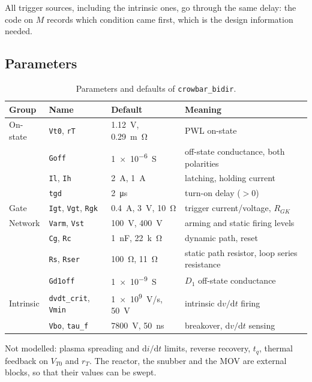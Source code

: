 \documentclass[11pt,a4paper]{article}
\begin{document}
All trigger sources, including the intrinsic ones, go through the same delay: the code on $M$
records which condition came first, which is the design information needed.

\subsection{Parameters}

\begin{table}[htbp]
\centering
\caption{Parameters and defaults of \texttt{crowbar\_bidir}.}
\label{tab:par}
\begin{tabular}{@{}llll@{}}
\toprule
Group & Name & Default & Meaning \\
\midrule
On-state & \texttt{Vt0}, \texttt{rT} & \SI{1.12}{V}, \SI{0.29}{m\ohm} & PWL on-state \\
 & \texttt{Goff} & \SI{1e-6}{S} & off-state conductance, both polarities \\
 & \texttt{Il}, \texttt{Ih} & \SI{2}{A}, \SI{1}{A} & latching, holding current \\
 & \texttt{tgd} & \SI{2}{\micro s} & turn-on delay ($>0$) \\
Gate & \texttt{Igt}, \texttt{Vgt}, \texttt{Rgk} & \SI{0.4}{A}, \SI{3}{V}, \SI{10}{\ohm} & trigger current/voltage, $R_{GK}$ \\
Network & \texttt{Varm}, \texttt{Vst} & \SI{100}{V}, \SI{400}{V} & arming and static firing levels \\
 & \texttt{Cg}, \texttt{Rc} & \SI{1}{nF}, \SI{22}{k\ohm} & dynamic path, reset \\
 & \texttt{Rs}, \texttt{Rser} & \SI{100}{\ohm}, \SI{11}{\ohm} & static path resistor, loop series resistance \\
 & \texttt{Gd1off} & \SI{1e-9}{S} & $D_1$ off-state conductance \\
Intrinsic & \texttt{dvdt\_crit}, \texttt{Vmin} & \SI{1e9}{V/s}, \SI{50}{V} & intrinsic $\mathrm{d}v/\mathrm{d}t$ firing \\
 & \texttt{Vbo}, \texttt{tau\_f} & \SI{7800}{V}, \SI{50}{ns} & breakover, $\mathrm{d}v/\mathrm{d}t$ sensing \\
\bottomrule
\end{tabular}
\end{table}

Not modelled: plasma spreading and $\mathrm{d}i/\mathrm{d}t$ limits, reverse recovery, $t_q$,
thermal feedback on $V_{T0}$ and $r_T$. The reactor, the snubber and the MOV are external
blocks, so that their values can be swept.
\end{document}
